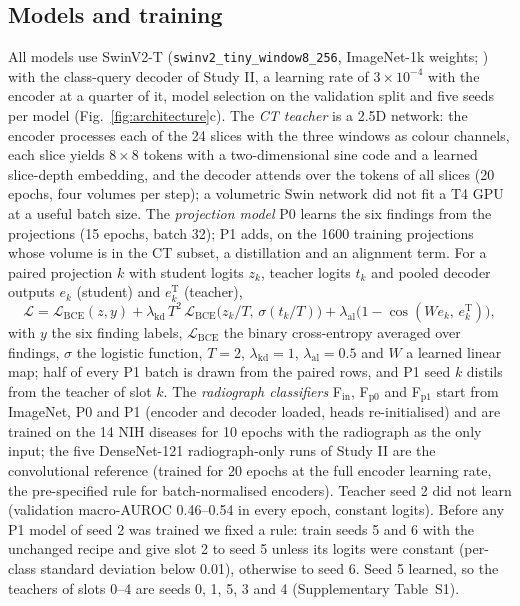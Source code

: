\subsection{Models and training}
\label{sec:xm_models}
All models use SwinV2-T (\texttt{swinv2\_tiny\_window8\_256}, ImageNet-1k weights; \citealp{liu2022swinv2,wightman2019timm}) with the
class-query decoder of Study II, a learning rate of $3\times10^{-4}$ with the encoder at a quarter of it, model selection on the validation
split and five seeds per model (Fig.~\ref{fig:architecture}c). The \emph{CT teacher} is a 2.5D network: the encoder processes each of the 24
slices with the three windows as colour channels, each slice yields $8\times8$ tokens with a two-dimensional sine code and a learned
slice-depth embedding, and the decoder attends over the tokens of all slices (20 epochs, four volumes per step); a volumetric Swin network did
not fit a T4 GPU at a useful batch size. The \emph{projection model} P0 learns the six findings from the projections (15 epochs, batch 32);
P1 adds, on the \num{1600} training projections whose volume is in the CT subset, a distillation and an alignment term. For a paired
projection $k$ with student logits $z_k$, teacher logits $t_k$ and pooled decoder outputs $e_k$ (student) and $e^{\mathrm{T}}_k$ (teacher),
\begin{equation}
\mathcal{L}=\mathcal{L}_{\mathrm{BCE}}(z,y)+\lambda_{\mathrm{kd}}\,T^{2}\,\mathcal{L}_{\mathrm{BCE}}\!\big(z_k/T,\,\sigma(t_k/T)\big)
+\lambda_{\mathrm{al}}\big(1-\cos(We_k,\,e^{\mathrm{T}}_k)\big),
\label{eq:kd}
\end{equation}
with $y$ the six finding labels, $\mathcal{L}_{\mathrm{BCE}}$ the binary cross-entropy averaged over findings, $\sigma$ the logistic
function, $T=2$,
$\lambda_{\mathrm{kd}}=1$, $\lambda_{\mathrm{al}}=0.5$ and $W$ a learned linear map; half of every P1 batch is drawn from the paired rows,
and P1 seed $k$ distils from the teacher of slot $k$. The \emph{radiograph classifiers} F$_\mathrm{in}$, F$_\mathrm{p0}$ and F$_\mathrm{p1}$
start from ImageNet, P0 and P1 (encoder and decoder loaded, heads re-initialised) and are trained on the 14 NIH diseases for 10 epochs with
the radiograph as the only input; the five DenseNet-121 radiograph-only runs of Study II are the convolutional reference (trained for 20
epochs at the full encoder learning rate, the pre-specified rule for batch-normalised encoders). Teacher seed 2 did
not learn (validation macro-AUROC 0.46--0.54 in every epoch, constant logits). Before any P1 model of seed 2 was trained we fixed a rule:
train seeds 5 and 6 with the unchanged recipe and give slot 2 to seed 5 unless its logits were constant (per-class standard deviation below
0.01), otherwise to seed 6. Seed 5 learned, so the teachers of slots 0--4 are seeds 0, 1, 5, 3 and 4 (Supplementary Table~S1).

